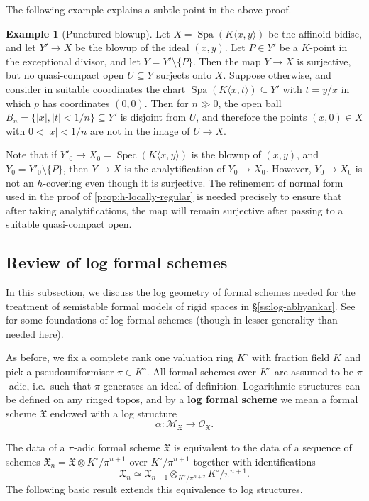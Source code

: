 \documentclass[a4paper,twoside,11pt,reqno]{amsart}
\newcommand{\cM}{{\mathcal M}}
\newcommand{\cO}{{\mathcal O}}
\newcommand{\fX}{{\mathfrak{X}}}
\DeclareMathOperator{\Spec}{Spec}
\DeclareMathOperator{\Spa}{Spa}
\theoremstyle{definition}
\newtheorem{ex}[thm]{Example}
\numberwithin{equation}{subsection}
\begin{document}
The following example explains a subtle point in the above proof. 

\begin{ex}[Punctured blowup]
Let $X = \Spa(K\langle x, y\rangle)$ be the affinoid bidisc, and let $Y'\to X$ be the blowup of the ideal $(x, y)$. Let $P \in Y'$ be a $K$-point in the exceptional divisor, and let $Y = Y'\setminus\{P\}$. Then the map $Y\to X$ is surjective, but no quasi-compact open $U\subseteq Y$ surjects onto $X$. Suppose otherwise, and consider in suitable coordinates the chart $\Spa(K\langle x,t\rangle)\subseteq Y'$ with $t=y/x$ in which $p$ has coordinates $(0,0)$. Then for $n\gg 0$, the open ball $B_n = \{|x|, |t|<1/n\}\subseteq Y'$ is disjoint from $U$, and therefore the points $(x,0) \in X$ with $0<|x|<1/n$ are not in the image of $U\to X$.  

Note that if $Y'_0\to X_0=\Spec(K\langle x, y\rangle)$ is the blowup of $(x,y)$, and $Y_0 = Y'_0\setminus\{P\}$, then $Y\to X$ is the analytification of $Y_0\to X_0$. However, $Y_0\to X_0$ is not an $h$-covering even though it is surjective. The refinement of normal form used in the proof of \cref{prop:h-locally-regular} is needed precisely to ensure that after taking analytifications, the map will remain surjective after passing to a suitable quasi-compact open.
\end{ex}

\subsection{Review of log formal schemes}
\label{ss:log-formal-schemes}

In this subsection, we discuss the log geometry of formal schemes needed for the treatment of semistable formal models of rigid spaces in \S\ref{ss:log-abhyankar}. See \cite[\S 7]{Fersi} for some foundations of log formal schemes (though in lesser generality than needed here).

As before, we fix a complete rank one valuation ring $K^\circ$ with fraction field $K$ and pick a pseudouniformiser $\pi\in K^\circ$. All formal schemes over $K^\circ$ are assumed to be $\pi$-adic, i.e.\ such that $\pi$ generates an ideal of definition. Logarithmic structures can be defined on any ringed topos, and by a {\bf log formal scheme} we mean a formal scheme $\mathfrak{X}$ endowed with a log structure 
\[
\alpha\colon\cM_\fX\to\cO_\fX.
\]

The data of a $\pi$-adic formal scheme $\fX$ is equivalent to the data of a sequence of schemes $\fX_n = \fX\otimes K^\circ/\pi^{n+1}$ over $K^\circ/\pi^{n+1}$ together with identifications
\[ 
    \fX_n \simeq \fX_{n+1} \otimes_{K^\circ/\pi^{n+2}} K^\circ/\pi^{n+1}.
\]
The following basic result extends this equivalence to log structures.
\end{document}
